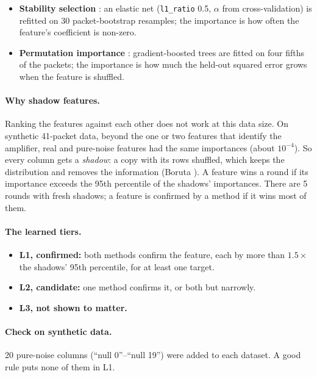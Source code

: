 \documentclass[10pt]{article}
\newcommand{\code}[1]{\texttt{#1}}
\begin{document}
\begin{itemize}
  \item \textbf{Stability selection} \cite{mb2010}: an elastic net (\code{l1\_ratio} 0.5, $\alpha$ from cross-validation)
        is refitted on 30 packet-bootstrap resamples; the importance is how often the feature's coefficient is non-zero.
  \item \textbf{Permutation importance} \cite{breiman2001}: gradient-boosted trees are fitted on four fifths of the
        packets; the importance is how much the held-out squared error grows when the feature is shuffled.
\end{itemize}

\paragraph{Why shadow features.} Ranking the features against each other does not work at this data size. On synthetic
41-packet data, beyond the one or two features that identify the amplifier, real and pure-noise features had the same
importances (about $10^{-4}$). So every column gets a \emph{shadow}: a copy with its rows shuffled, which keeps the
distribution and removes the information (Boruta \cite{boruta2010}). A feature wins a round if its importance exceeds
the 95th percentile of the shadows' importances. There are 5 rounds with fresh shadows; a feature is confirmed by a
method if it wins most of them.

\paragraph{The learned tiers.}
\begin{itemize}
  \item \textbf{L1, confirmed:} both methods confirm the feature, each by more than $1.5\times$ the shadows' 95th
        percentile, for at least one target.
  \item \textbf{L2, candidate:} one method confirms it, or both but narrowly.
  \item \textbf{L3, not shown to matter.}
\end{itemize}

\paragraph{Check on synthetic data.} 20 pure-noise columns (``null 0''--``null 19'') were added to each dataset. A good
rule puts none of them in L1.
\end{document}
